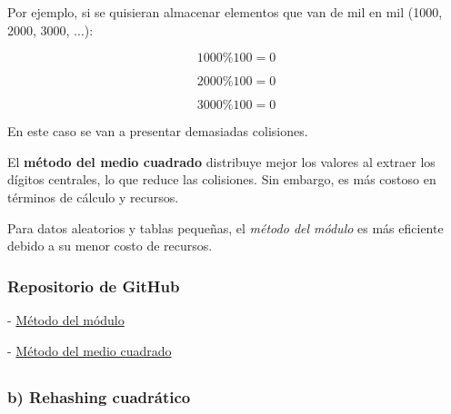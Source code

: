 \documentclass{scrreprt}
\begin{document}
Por ejemplo, si se quisieran almacenar elementos que van de mil en mil (1000, 2000, 3000, ...):

\begin{equation}
1000 \% 100 = 0
\end{equation}

\begin{equation}
2000 \% 100 = 0
\end{equation}

\begin{equation}
3000 \% 100 = 0
\end{equation}

En este caso se van a presentar demasiadas colisiones.


El \textbf{método del medio cuadrado} distribuye mejor los valores al extraer los dígitos centrales, lo que reduce las colisiones. Sin embargo, es más costoso en términos de cálculo y recursos.

Para datos aleatorios y tablas pequeñas, el \textit{método del módulo} es más eficiente debido a su menor costo de recursos.



\subsubsection{\textbf{Repositorio de GitHub}}

- \href{https://github.com/NejoBMG/TP3_EDA/blob/main/ArchivoDeEnteros.java}{Método del módulo}


- \href{https://github.com/NejoBMG/TP3_EDA/blob/main/ArchivoDeEnterosM.java}{Método del medio cuadrado}


\newpage
\subsection{}
\subsubsection{b) Rehashing cuadrático}
\end{document}
